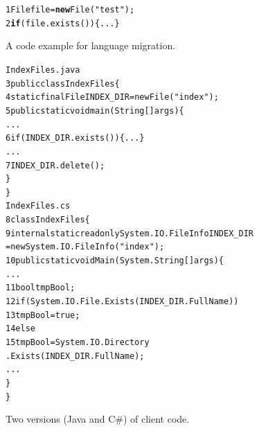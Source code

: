 \begin{figure}[t]
\begin{CodeOut}
\begin{alltt}
1  File file = \textbf{new} File("test");
2    \textbf{if}(file.exists())\{...\}
\end{alltt}
\end{CodeOut}\vspace*{-4ex}
\caption{\label{fig:totranslation} A code example for language
migration.}%
\end{figure}
\begin{figure}[t]
\begin{CodeOut}\vspace*{-2ex}
\begin{alltt}
                  IndexFiles.java
3 public class IndexFiles \{
4   static final File INDEX_DIR = new File("index");
5   public static void main(String[] args) \{
      ...
6     if (INDEX_DIR.exists()) \{...\}
      ...
7       INDEX_DIR.delete();
    \}
  \}
                  IndexFiles.cs
8 class IndexFiles\{
9   internal static readonly System.IO.FileInfo INDEX_DIR
          = new System.IO.FileInfo("index");
10   public static void  Main(System.String[] args)\{
      ...
11     bool tmpBool;
12     if (System.IO.File.Exists(INDEX_DIR.FullName))
13       tmpBool = true;
14    else
15       tmpBool = System.IO.Directory
                         .Exists(INDEX_DIR.FullName);
      ...
    \}
 \}
\end{alltt}
\end{CodeOut}\vspace*{-4ex}
\caption{\label{fig:clientcode} Two versions (Java and C\#) of
client code.}\vspace*{-4ex}
\end{figure}

